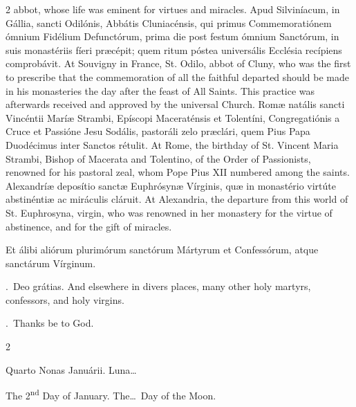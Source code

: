 \begin{paracol}{2}
 abbot, whose life was eminent for virtues and miracles.
\switchcolumn*
{}
Apud Silviníacum, in Gállia, sancti Odilónis, 
 Abbátis Cluniacénsis, qui primus Commemoratiónem ómnium Fidélium Defunctórum, 
 prima die post festum ómnium Sanctórum, in suis monastériis fíeri præcépit; 
 quem ritum póstea universális Ecclésia recípiens comprobávit.
\switchcolumn
{}
At Souvigny in France, St. Odilo, abbot of Cluny, who was the first to 
 prescribe that the commemoration of all the faithful departed should be made 
 in his monasteries the day after the feast of All Saints. This 
 practice was afterwards received and approved by the universal Church.
\switchcolumn*
{}
Romæ natális sancti Vincéntii Maríæ Strambi, 
 Epíscopi Maceraténsis et Tolentíni, Congregatiónis a Cruce et Passióne Jesu 
 Sodális, pastoráli zelo præclári, quem Pius Papa Duodécimus inter Sanctos 
 rétulit.
\switchcolumn
{}
At Rome, the birthday of St. Vincent Maria Strambi, Bishop of Macerata and 
 Tolentino, of the Order of Passionists, renowned for his pastoral zeal, whom 
 Pope Pius XII numbered among the saints.
\switchcolumn*
{}
Alexandríæ deposítio sanctæ Euphrósynæ Vírginis, 
 quæ in monastério virtúte abstinéntiæ ac miráculis cláruit.
\switchcolumn
{}
At Alexandria, the departure from this world of St. Euphrosyna, virgin, who 
 was renowned in her monastery for the virtue of abstinence, and for the gift 
 of miracles.
\switchcolumn*

\rubric{\P} Et álibi aliórum plurimórum sanctórum Mártyrum et Confessórum, atque sanctárum Vírginum.

\textcolor{gregoriocolor}{\Rbar.}~Deo grátias.
\switchcolumn
{}
\rubric{\P} And elsewhere in divers places, many other holy martyrs, confessors, and holy virgins.

\textcolor{gregoriocolor}{\Rbar.}~Thanks be to God.
\switchcolumn*

\switchcolumn
{}
\switchcolumn*

\end{paracol}



\begin{paracol}{2}
\begin{center}{\color{gregoriocolor} Quarto Nonas Januárii. 
 Luna\dots\ }\end{center}
\switchcolumn
{}
\begin{center}{\color{gregoriocolor} The   2\textsuperscript{nd} Day of 
 January. The\dots\ Day of the Moon.}\end{center}
\end{paracol}


